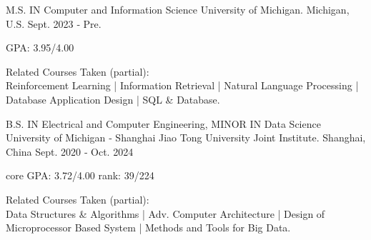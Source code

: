 

\begin{cventries}

\cventry
{M.S. IN Computer and Information Science} %
{University of Michigan.} %
{Michigan, U.S.} %
{Sept. 2023 ‑ Pre.} %
{
  \begin{cvitems} %
    \item {GPA: 3.95/4.00}
    \item {Related Courses Taken (partial):} \\
    Reinforcement Learning | Information Retrieval | Natural Language Processing | Database Application Design | SQL \& Database. \\
  \end{cvitems}
}

\vspace{-0.5cm}
\cventry
{B.S. IN Electrical and Computer Engineering, MINOR IN Data Science} %
{University of Michigan ‑ Shanghai Jiao Tong University Joint Institute.} %
{Shanghai, China} %
{Sept. 2020 ‑ Oct. 2024} %
{
\begin{cvitems} %
  \item {core GPA: 3.72/4.00 \quad rank: 39/224}
  \item {Related Courses Taken (partial): }\\
  Data Structures \& Algorithms | Adv. Computer Architecture | Design of Microprocessor Based System | Methods and Tools for Big Data. 
\end{cvitems}
}

\end{cventries}

